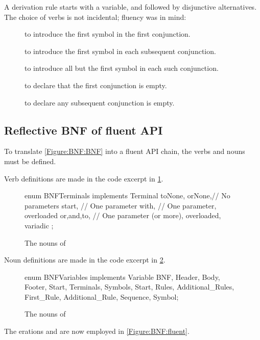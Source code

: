 A derivation rule starts with a variable, and followed by disjunctive alternatives.
The choice of verbs is not incidental; fluency was in mind:
\begin{description}
  \item[] to introduce the first symbol in the first conjunction.
  \item[] to introduce the first symbol in each subsequent conjunction.
  \item[] to introduce all but the first symbol in each such conjunction.
  \item[] to declare that the first conjunction is empty.
  \item[] to declare any subsequent conjunction is empty.
\end{description}

\subsection{Reflective BNF of fluent API}

To translate \cref{Figure:BNF:BNF} into a fluent
API chain, the verbs and nouns must be defined.

Verb definitions are made in the code excerpt in
\cref{Figure:Verbs}.

\begin{figure}[htbp]
  \begin{JAVA}[style=code]
enum BNFTerminals implements Terminal {
  toNone, orNone,// No parameters
  start,         // One parameter 
  with,          // One parameter, overloaded 
  or,and,to,     // One parameter (or more), overloaded, variadic 
  ;
} \end{JAVA}
  \caption{The nouns of \SELF}
  \label{Figure:Verbs}
\end{figure}

Noun definitions are made in the code excerpt in \cref{Figure:Nouns}.

\begin{figure}[htbp]
  \begin{JAVA}[style=code]
enum BNFVariables implements Variable {
  BNF, Header, Body, Footer,
  Start, Terminals, Symbols,
  Start, Rules, Additional_Rules,
  First_Rule, Additional_Rule,
  Sequence, Symbol;
}\end{JAVA}
  \caption{The nouns of \SELF}
  \label{Figure:Nouns}
\end{figure}

The
erations  and
  are now employed in \cref{Figure:BNF:fluent}.


